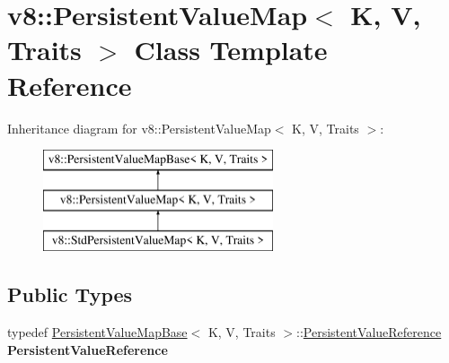 \hypertarget{classv8_1_1_persistent_value_map}{}\section{v8\+:\+:Persistent\+Value\+Map$<$ K, V, Traits $>$ Class Template Reference}
\label{classv8_1_1_persistent_value_map}
Inheritance diagram for v8\+:\+:Persistent\+Value\+Map$<$ K, V, Traits $>$\+:\begin{figure}[H]
\begin{center}
\leavevmode
\includegraphics[height=3.000000cm]{classv8_1_1_persistent_value_map}
\end{center}
\end{figure}
\subsection*{Public Types}
\begin{DoxyCompactItemize}
\item 
typedef \hyperlink{classv8_1_1_persistent_value_map_base}{Persistent\+Value\+Map\+Base}$<$ K, V, Traits $>$\+::\hyperlink{classv8_1_1_persistent_value_map_base_1_1_persistent_value_reference}{Persistent\+Value\+Reference} {\bfseries Persistent\+Value\+Reference}\hypertarget{classv8_1_1_persistent_value_map_a81ed968e13bcef1cd97a09fd024f30f2}{}\label{classv8_1_1_persistent_value_map_a81ed968e13bcef1cd97a09fd024f30f2}

\end{DoxyCompactItemize}
